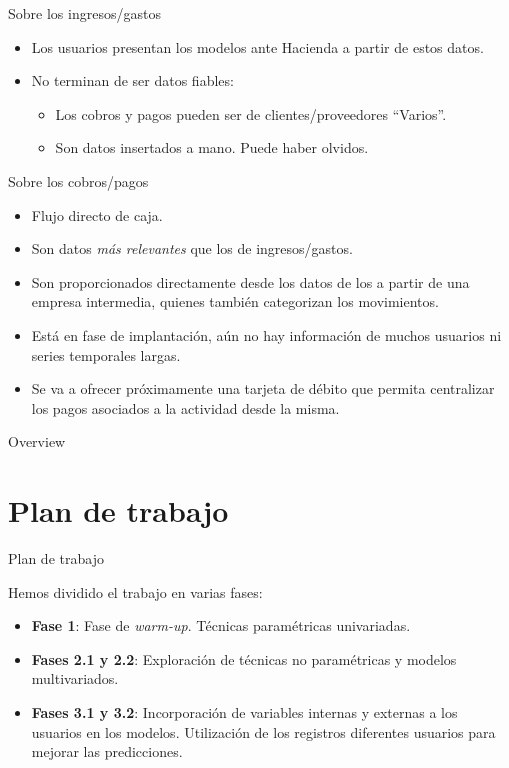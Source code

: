 \documentclass[12pt, aspectratio=169]{beamer} %
\begin{document}
\begin{frame}{Sobre los ingresos/gastos}
  \begin{itemize}
  \item Los usuarios presentan los modelos ante Hacienda a partir de estos datos.
  \item No terminan de ser datos fiables:
    \begin{itemize}
    \item Los cobros y pagos pueden ser de clientes/proveedores ``Varios''.
    \item Son datos insertados a mano. Puede haber olvidos.
    \end{itemize}
  \end{itemize}
\end{frame}

\begin{frame}{Sobre los cobros/pagos}
  \begin{itemize}
  \item Flujo directo de caja.
  \item Son datos \textit{más relevantes} que los de ingresos/gastos. 
  \item Son proporcionados directamente desde los datos de los a partir de una empresa intermedia, quienes también categorizan los movimientos.
  \item Está en fase de implantación, aún no hay información de muchos usuarios ni series temporales largas.
  \item Se va a ofrecer próximamente una tarjeta de débito que permita centralizar los pagos asociados a la actividad desde la misma.
  \end{itemize}
\end{frame}


\begin{frame}{Overview}
\tableofcontents
\end{frame}


\section{Plan de trabajo}


\begin{frame}{Plan de trabajo}

  Hemos dividido el trabajo en varias fases:
  \begin{itemize}
  \item \textbf{Fase 1}: Fase de \textit{warm-up}. Técnicas paramétricas univariadas.
  \item \textbf{Fases 2.1 y 2.2}: Exploración de técnicas no paramétricas y modelos multivariados.
  \item \textbf{Fases 3.1 y 3.2}: Incorporación de variables internas y externas a los usuarios en los modelos. Utilización de los registros diferentes usuarios para mejorar las predicciones.
  \end{itemize}

\end{frame}
\end{document}
